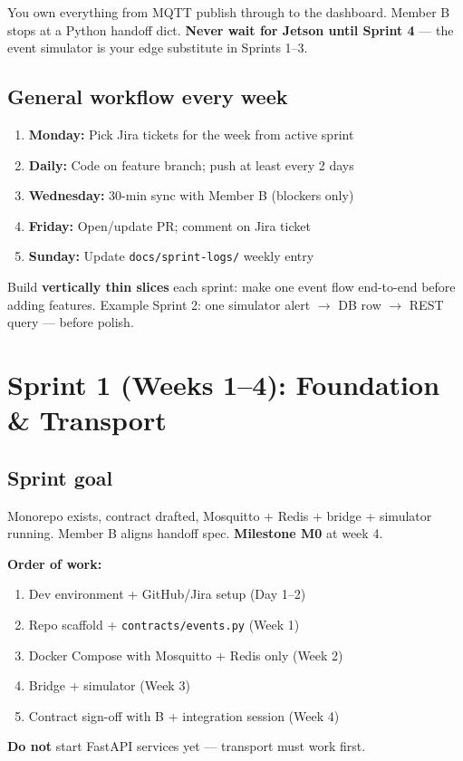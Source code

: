 \documentclass[12pt,a4paper]{report}
\begin{document}
You own everything from MQTT publish through to the dashboard. Member B stops at a Python handoff dict. \textbf{Never wait for Jetson until Sprint 4} --- the event simulator is your edge substitute in Sprints 1--3.

\section{General workflow every week}

\begin{enumerate}
    \item \textbf{Monday:} Pick Jira tickets for the week from active sprint
    \item \textbf{Daily:} Code on feature branch; push at least every 2 days
    \item \textbf{Wednesday:} 30-min sync with Member B (blockers only)
    \item \textbf{Friday:} Open/update PR; comment on Jira ticket
    \item \textbf{Sunday:} Update \texttt{docs/sprint-logs/} weekly entry
\end{enumerate}

\begin{tipbox}
Build \textbf{vertically thin slices} each sprint: make one event flow end-to-end before adding features. Example Sprint 2: one simulator alert $\rightarrow$ DB row $\rightarrow$ REST query --- before polish.
\end{tipbox}

\chapter{Sprint 1 (Weeks 1--4): Foundation \& Transport}

\section{Sprint goal}

Monorepo exists, contract drafted, Mosquitto + Redis + bridge + simulator running. Member B aligns handoff spec. \textbf{Milestone M0} at week 4.

\begin{approachbox}
\textbf{Order of work:}
\begin{enumerate}
    \item Dev environment + GitHub/Jira setup (Day 1--2)
    \item Repo scaffold + \texttt{contracts/events.py} (Week 1)
    \item Docker Compose with Mosquitto + Redis only (Week 2)
    \item Bridge + simulator (Week 3)
    \item Contract sign-off with B + integration session (Week 4)
\end{enumerate}
\textbf{Do not} start FastAPI services yet --- transport must work first.
\end{approachbox}
\end{document}
